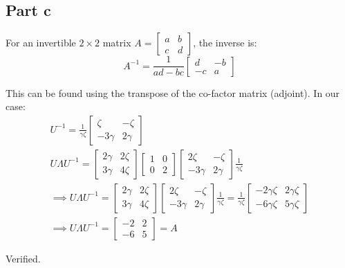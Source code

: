 \documentclass{article}
\begin{document}
\subsection*{Part c}
\begin{flushleft}
For an invertible \(2 \times 2\) matrix \(A = \begin{bmatrix} a & b \\ c & d \end{bmatrix}\), the inverse is:
\begin{equation*}
A^{-1} = \frac{1}{ad - bc} \begin{bmatrix} d & -b \\ -c & a \end{bmatrix} 
\end{equation*}

This can be found using the transpose of the co-factor matrix (adjoint). In our case:
\begin{gather*}
U^{-1} = \frac{1}{\gamma \zeta} \begin{bmatrix} \zeta & -\zeta \\ -3\gamma & 2\gamma \end{bmatrix} \\
U\Lambda U^{-1} = \begin{bmatrix} 2\gamma & 2\zeta \\ 3\gamma & 4\zeta \end{bmatrix} \begin{bmatrix} 1 & 0 \\ 0 & 2 \end{bmatrix} \begin{bmatrix} 2\zeta & -\zeta \\ -3\gamma & 2\gamma \end{bmatrix} \frac{1}{\gamma \zeta}\\
\implies U\Lambda U^{-1} = \begin{bmatrix} 2\gamma & 2\zeta \\ 3\gamma & 4 \zeta \end{bmatrix} \begin{bmatrix} 2\zeta & -\zeta \\ -3\gamma & 2\gamma \end{bmatrix} \frac{1}{\gamma \zeta} = \frac{1}{\gamma \zeta} \begin{bmatrix} -2\gamma \zeta & 2\gamma \zeta \\ -6\gamma \zeta & 5\gamma\zeta\end{bmatrix} \\
\implies U\Lambda U^{-1} = \begin{bmatrix} -2 & 2 \\ -6 & 5 \end{bmatrix} = A
\end{gather*}

Verified. 
\end{flushleft}
\end{document}
